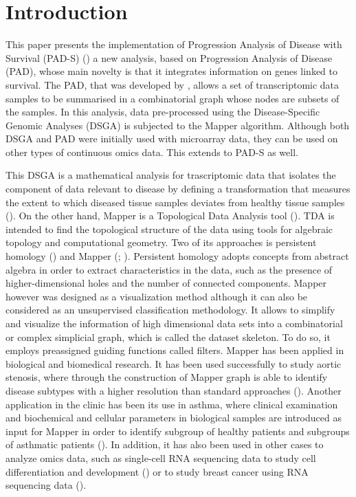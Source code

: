 \section{Introduction}\label{introduction}

This paper presents the implementation of Progression Analysis of Disease with Survival (PAD-S) (\citet{fores2022progression}) a new analysis, based on Progression Analysis of Disease (PAD), whose main novelty is that it integrates information on genes linked to survival. The PAD, that was developed by \citet{Nicolau2011}, allows a set of transcriptomic data samples to be summarised in a combinatorial graph whose nodes are subsets of the samples. In this analysis, data pre-processed using the Disease-Specific Genomic Analyses (DSGA) is subjected to the Mapper algorithm. Although both DSGA and PAD were initially used with microarray data, they can be used on other types of continuous omics data. This extends to PAD-S as well.

This DSGA is a mathematical analysis for trascriptomic data that isolates the component of data relevant to disease by defining a transformation that measures the extent to which diseased tissue samples deviates from healthy tissue samples (\citet{Nicolau2007}). On the other hand, Mapper is a Topological Data Analysis tool (\citet{carlsson2009topology}). TDA is intended to find the topological structure of the data using tools for algebraic topology and computational geometry. Two of its approaches is persistent homology (\citet{edelsbrunner2022computational}) and Mapper (\citet{singh2007topological}; \citet{lum2013extracting}). Persistent homology adopts concepts from abstract algebra in order to extract characteristics in the data, such as the presence of higher-dimensional holes and the number of connected components. Mapper however was designed as a visualization method although it can also be considered as an unsupervised classification methodology. It allows to simplify and visualize the information of high dimensional data sets into a combinatorial or complex simplicial graph, which is called the dataset skeleton. To do so, it employs preassigned guiding functions called filters. Mapper has been applied in biological and biomedical research. It has been used successfully to study aortic stenosis, where through the construction of Mapper graph is able to identify disease subtypes with a higher resolution than standard approaches (\citet{casaclang2019network}). Another application in the clinic has been its use in asthma, where clinical examination and biochemical and cellular parameters in biological samples are introduced as input for Mapper in order to identify subgroup of healthy patients and subgroups of asthmatic patients (\citet{hinks2015innate}). In addition, it has also been used in other cases to analyze omics data, such as single-cell RNA sequencing data to study cell differentiation and development (\citet{rizvi2017single}) or to study breast cancer using RNA sequencing data (\citet{mathews2019robust}).

